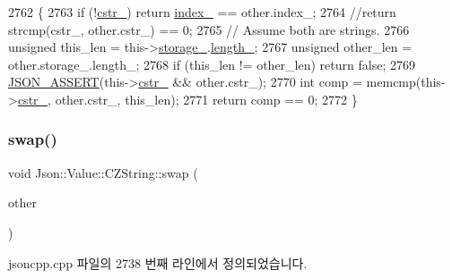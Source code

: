 \begin{DoxyCode}
2762                                                           \{
2763   \textcolor{keywordflow}{if} (!\hyperlink{class_json_1_1_value_1_1_c_z_string_a5b4d28349294034d7f779c3c95d0306c}{cstr\_}) \textcolor{keywordflow}{return} \hyperlink{class_json_1_1_value_1_1_c_z_string_aecf29982235c9c165a0971023ebbb270}{index\_} == other.index\_;
2764   \textcolor{comment}{//return strcmp(cstr\_, other.cstr\_) == 0;}
2765   \textcolor{comment}{// Assume both are strings.}
2766   \textcolor{keywordtype}{unsigned} this\_len = this->\hyperlink{class_json_1_1_value_1_1_c_z_string_a17c92f0f089a4314e3b1d5695dc1a851}{storage\_}.\hyperlink{struct_json_1_1_value_1_1_c_z_string_1_1_string_storage_a165d865c44e6471d34668eeb4f15b140}{length\_};
2767   \textcolor{keywordtype}{unsigned} other\_len = other.storage\_.length\_;
2768   \textcolor{keywordflow}{if} (this\_len != other\_len) \textcolor{keywordflow}{return} \textcolor{keyword}{false};
2769   \hyperlink{json_8h_a188941dcc789ccb6539c3d6f41405582}{JSON\_ASSERT}(this->\hyperlink{class_json_1_1_value_1_1_c_z_string_a5b4d28349294034d7f779c3c95d0306c}{cstr\_} && other.cstr\_);
2770   \textcolor{keywordtype}{int} comp = memcmp(this->\hyperlink{class_json_1_1_value_1_1_c_z_string_a5b4d28349294034d7f779c3c95d0306c}{cstr\_}, other.cstr\_, this\_len);
2771   \textcolor{keywordflow}{return} comp == 0;
2772 \}
\end{DoxyCode}
\mbox{\label{class_json_1_1_value_1_1_c_z_string_ad59f3542d2eea749a6a63409d1a02207}} 
\subsubsection{\texorpdfstring{swap()}{swap()}}
{\footnotesize\ttfamily void Json\+::\+Value\+::\+C\+Z\+String\+::swap (\begin{DoxyParamCaption}\item[{\hyperlink{class_json_1_1_value_1_1_c_z_string}{C\+Z\+String} \&}]{other }\end{DoxyParamCaption})\hspace{0.3cm}{\ttfamily [private]}}



jsoncpp.\+cpp 파일의 2738 번째 라인에서 정의되었습니다.


